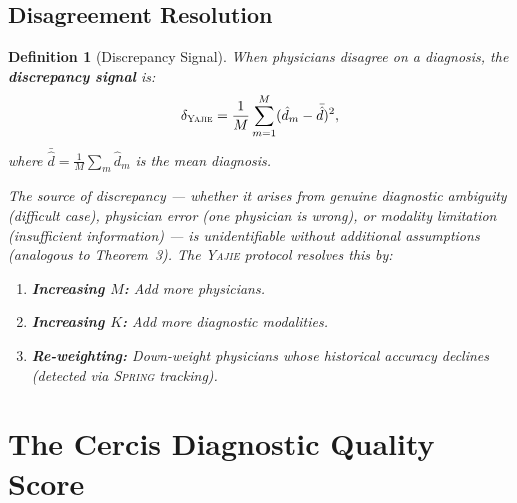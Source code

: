 \documentclass[11pt,a4paper]{article}
\newtheorem{definition}[theorem]{Definition}
\theoremstyle{definition}
\newcommand{\Yajie}{\textsc{Yajie}}
\newcommand{\Spring}{\textsc{Spring}}
\newcommand{\diagnosis}{\hat{d}}               %
\begin{document}
\subsection{Disagreement Resolution}

\begin{definition}[Discrepancy Signal]
\label{def:discrepancy}
When physicians disagree on a diagnosis, the \textbf{discrepancy signal} is:
\begin{equation}
    \delta_{\Yajie} = \frac{1}{M}\sum_{m=1}^{M} (\diagnosis_m - \bar{\diagnosis})^2,
\end{equation}
where $\bar{\diagnosis} = \frac{1}{M}\sum_m \diagnosis_m$ is the mean diagnosis.

The source of discrepancy --- whether it arises from genuine diagnostic
ambiguity (difficult case), physician error (one physician is wrong),
or modality limitation (insufficient information) --- is unidentifiable
without additional assumptions (analogous to Theorem~3). The \Yajie{}
protocol resolves this by:
\begin{enumerate}[nosep]
    \item \textbf{Increasing $M$:} Add more physicians.
    \item \textbf{Increasing $K$:} Add more diagnostic modalities.
    \item \textbf{Re-weighting:} Down-weight physicians whose historical
    accuracy declines (detected via \Spring{} tracking).
\end{enumerate}
\end{definition}

\section{The Cercis Diagnostic Quality Score}
\label{sec:cercis}
\end{document}
